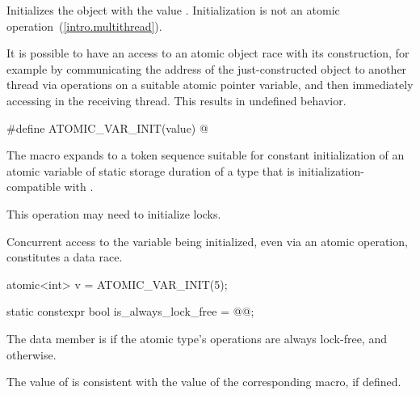 \begin{itemdescr}
\pnum
\effects Initializes the object with the value .
Initialization is not an atomic operation~(\ref{intro.multithread}).
\begin{note} It is possible to have an access to an atomic object 
race with its construction, for example by communicating the address of the
just-constructed object  to another thread via
 operations on a suitable atomic pointer
variable, and then immediately accessing  in the receiving thread.
This results in undefined behavior. \end{note}
\end{itemdescr}

%
\begin{itemdecl}
#define ATOMIC_VAR_INIT(value) @\seebelow@
\end{itemdecl}

\begin{itemdescr}
\pnum
The macro expands to a token sequence suitable for
constant initialization of
an atomic variable of static storage duration of a type that is
initialization-compatible with .
\begin{note} This operation may need to initialize locks. \end{note}
Concurrent access to the variable being initialized, even via an atomic operation,
constitutes a data race. \begin{example}
\begin{codeblock}
atomic<int> v = ATOMIC_VAR_INIT(5);
\end{codeblock}
\end{example}
\end{itemdescr}

%
%
%
\begin{itemdecl}
static constexpr bool is_always_lock_free = @@;
\end{itemdecl}

\begin{itemdescr}
\pnum
The  data member  is 
if the atomic type's operations are always lock-free, and  otherwise.
\begin{note}
The value of  is consistent with the value of
the corresponding  macro, if defined.
\end{note}
\end{itemdescr}

